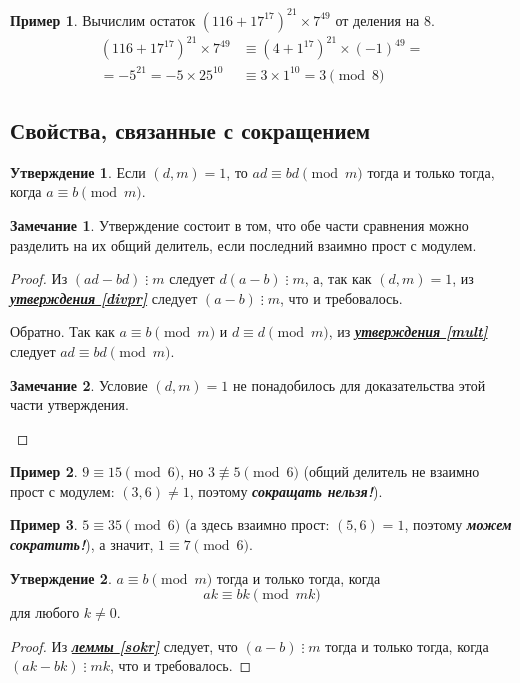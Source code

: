 \documentclass[14pt, a4paper]{extarticle}
\theoremstyle{definition}
\newtheorem*{remark}{Замечание}
\newtheorem{example}{Пример}
\newtheorem{statement}{Утверждение}
\newcommand{\divisible}{\mathop{\vdots}}
\begin{document}
	\begin{example}
		Вычислим остаток $(116+17^{17})^{21}\times7^{49}$ от деления на $8$.
		\begin{align*}
			(116+17^{17})^{21}\times7^{49}&\equiv(4+1^{17})^{21}\times(-1)^{49}=\\
			=-5^{21}=-5\times25^{10}&\equiv3\times1^{10}=3\pmod{8}
		\end{align*}
	\end{example}

\subsection{Свойства, связанные с сокращением}
\label{skrsr}

	\begin{statement}
	\label{sokrmod}
		Если $(d,m)=1$, то $ad\equiv bd\pmod{m}$ тогда и только тогда, когда \mbox{$a\equiv b\pmod{m}$}.
	\end{statement}
	\begin{remark}
		Утверждение состоит в том, что обе части сравнения можно разделить на их общий делитель, если последний взаимно прост с модулем.
	\end{remark}
	\begin{proof}
		Из $(ad-bd)\divisible m$ следует $d(a-b)\divisible m$, а, так как $(d,m)=1$, из \hyperref[divpr]{\textbf{\textit{утверждения \ref*{divpr}}}} следует $(a-b)\divisible m$, что и требовалось.
		
		Обратно. Так как $a\equiv b\pmod{m}$ и $d\equiv d\pmod{m}$, из \hyperref[mult]{\textbf{\textit{утверждения \ref*{mult}}}} следует $ad\equiv bd\pmod{m}$.
		\begin{remark}
			Условие $(d,m)=1$ не понадобилось для доказательства этой части утверждения.
		\end{remark}
	\end{proof}

	\begin{example}
		$9\equiv15\pmod{6}$, но $3\not\equiv5\pmod{6}$ (общий делитель не взаимно прост с модулем: $(3,6)\neq1$, поэтому \textbf{\textit{сокращать нельзя!}}).
	\end{example}
	\begin{example}
		$5\equiv35\pmod{6}$ (а здесь взаимно прост: $(5,6)=1$, поэтому \textbf{\textit{можем сократить!}}), а значит, $1\equiv7\pmod{6}$.
	\end{example}

	\begin{statement}
	\label{sokrmod2}
		$a\equiv b\pmod{m}$ тогда и только тогда, когда $$ak\equiv bk\pmod{mk}$$ для любого $k\neq0$.
	\end{statement}
	\begin{proof}
		Из \hyperref[sokr]{\textbf{\textit{леммы \ref*{sokr}}}} следует, что $(a-b)\divisible m$ тогда и только тогда, когда $(ak-bk)\divisible mk$, что и требовалось.
	\end{proof}
\end{document}
